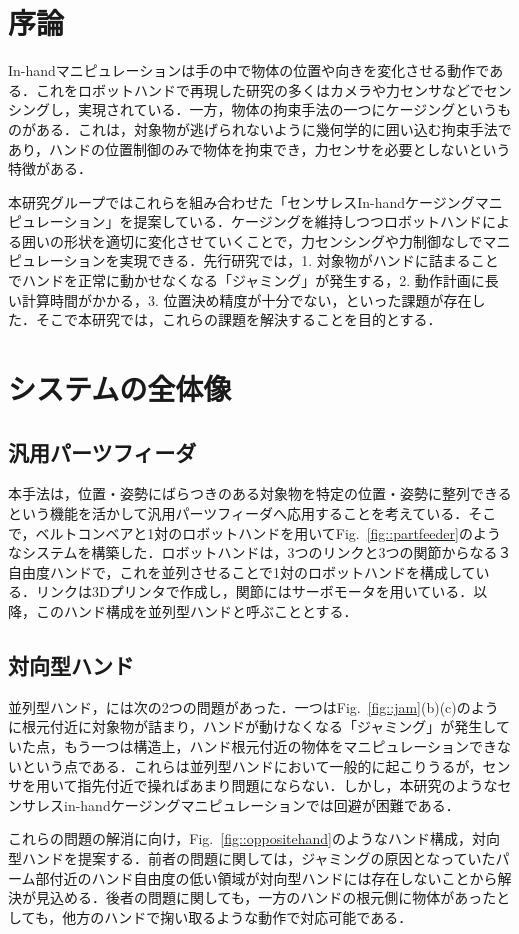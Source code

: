 \documentclass[a4paper,papersize,dvipdfmx]{mtabst}
\newcommand{\figref}[1]{Fig.~\ref{#1}}
\begin{document}
\section{序論}
In-handマニピュレーションは手の中で物体の位置や向きを変化させる動作である．これをロボットハンドで再現した研究の多くはカメラや力センサなどでセンシングし，実現されている．一方，物体の拘束手法の一つにケージング\cite{rimon1999}というものがある．これは，対象物が逃げられないように幾何学的に囲い込む拘束手法であり，ハンドの位置制御のみで物体を拘束でき，力センサを必要としないという特徴がある．\par
本研究グループではこれらを組み合わせた「センサレスIn-handケージングマニピュレーション」を提案している．ケージングを維持しつつロボットハンドによる囲いの形状を適切に変化させていくことで，力センシングや力制御なしでマニピュレーションを実現できる．先行研究\cite{komiyama2021}では，1. 対象物がハンドに詰まることでハンドを正常に動かせなくなる「ジャミング」が発生する，2. 動作計画に長い計算時間がかかる，3. 位置決め精度が十分でない，といった課題が存在した．そこで本研究では，これらの課題を解決することを目的とする．


\section{システムの全体像}
\subsection{汎用パーツフィーダ \cite{kamikukita2022}}
本手法は，位置・姿勢にばらつきのある対象物を特定の位置・姿勢に整列できるという機能を活かして汎用パーツフィーダへ応用することを考えている．そこで，ベルトコンベアと1対のロボットハンドを用いて\figref{fig::partfeeder}のようなシステムを構築した．ロボットハンドは，3つのリンクと3つの関節からなる３自由度ハンドで，これを並列させることで1対のロボットハンドを構成している．リンクは3Dプリンタで作成し，関節にはサーボモータを用いている．以降，このハンド構成を並列型ハンドと呼ぶこととする．

\subsection{対向型ハンド}
並列型ハンド\cite{komiyama2021}，\cite{kamikukita2022}には次の2つの問題があった．一つは\figref{fig::jam}(b)(c)のように根元付近に対象物が詰まり，ハンドが動けなくなる「ジャミング」が発生していた点，もう一つは構造上，ハンド根元付近の物体をマニピュレーションできないという点である．これらは並列型ハンドにおいて一般的に起こりうるが，センサを用いて指先付近で操ればあまり問題にならない．しかし，本研究のようなセンサレスin-handケージングマニピュレーションでは回避が困難である．\par
これらの問題の解消に向け，\figref{fig::oppositehand}のようなハンド構成，対向型ハンドを提案する．前者の問題に関しては，ジャミングの原因となっていたパーム部付近のハンド自由度の低い領域が対向型ハンドには存在しないことから解決が見込める．後者の問題に関しても，一方のハンドの根元側に物体があったとしても，他方のハンドで掬い取るような動作で対応可能である．
\end{document}
